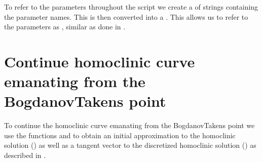 \documentclass[letterpaper,10pt,english]{jupyterBook}
\begin{document}
\begin{sphinxVerbatim}[commandchars=\\\{\}]
\PYGZca{}\PYGZca{}\PYGZca{}\PYGZca{}\PYGZca{}
\PYG{p}{[}\PYG{p}{]}
\PYG{p}{[}\PYG{p}{]}
\end{sphinxVerbatim}

\sphinxAtStartPar
To refer to the parameters throughout the script we create a  of
strings containing the parameter names. This is then converted into a
. This allows us to refer to the parameters as ,
similar as done in .

\begin{sphinxVerbatim}[commandchars=\\\{\}]
\PYG{p}{[}\PYG{p}{]}
\end{sphinxVerbatim}


\section{Continue homoclinic curve emanating from the Bogdanov\sphinxhyphen{}Takens point}
\label{\detokenize{IFOC:continue-homoclinic-curve-emanating-from-the-bogdanov-takens-point}}
\sphinxAtStartPar
To continue the homoclinic curve emanating from the Bogdanov\sphinxhyphen{}Takens point we
use the functions  and  to obtain an initial
approximation to the homoclinic solution () as well as a tangent vector
to the discretized homoclinic solution () as described in
{\hyperref[\detokenize{Morris-Lecar:initial-prediction-homoclinic-orbit}]{}}.
\end{document}
